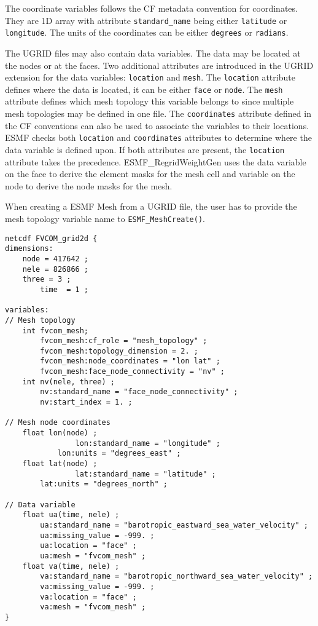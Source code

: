 The coordinate variables follows the CF metadata convention for coordinates.  They are 1D array with attribute
{\tt standard\_name} being either {\tt latitude} or {\tt longitude}.  The units of the coordinates can be either {\tt degrees} or {\tt radians}.

The UGRID files may also contain data variables.  The data may be located at the nodes or at the faces.  Two additional attributes are introduced in the UGRID extension for the data variables:  {\tt location} and {\tt mesh}.  The {\tt location}
attribute defines where the data is located, it can be either {\tt face} or {\tt node}.  The {\tt mesh} attribute defines which mesh topology this variable belongs to since multiple mesh topologies may be defined in one
file.  The {\tt coordinates} attribute defined in the CF conventions can also be used to associate the variables to their locations.  ESMF checks both {\tt location} and {\tt coordinates} attributes to determine where the data variable is defined upon. If both attributes are present, the {\tt location} attribute takes the precedence.  ESMF\_RegridWeightGen uses the data variable on the face to derive the element masks for the mesh cell and variable on the node to derive the node masks for the mesh.

When creating a ESMF Mesh from a UGRID file, the user has to provide the mesh topology variable name to {\tt ESMF\_MeshCreate()}.

\begin{verbatim}
netcdf FVCOM_grid2d {
dimensions:
	node = 417642 ;
	nele = 826866 ;
	three = 3 ;
        time  = 1 ;

variables:
// Mesh topology
	int fvcom_mesh;
		fvcom_mesh:cf_role = "mesh_topology" ;
		fvcom_mesh:topology_dimension = 2. ;
		fvcom_mesh:node_coordinates = "lon lat" ;
		fvcom_mesh:face_node_connectivity = "nv" ;
	int nv(nele, three) ;
		nv:standard_name = "face_node_connectivity" ;
		nv:start_index = 1. ;

// Mesh node coordinates
	float lon(node) ;
                lon:standard_name = "longitude" ;
	        lon:units = "degrees_east" ;
	float lat(node) ;
                lat:standard_name = "latitude" ;
		lat:units = "degrees_north" ;

// Data variable
	float ua(time, nele) ;
		ua:standard_name = "barotropic_eastward_sea_water_velocity" ;
		ua:missing_value = -999. ;
		ua:location = "face" ;
		ua:mesh = "fvcom_mesh" ;
	float va(time, nele) ;
		va:standard_name = "barotropic_northward_sea_water_velocity" ;
		va:missing_value = -999. ;
		va:location = "face" ;
		va:mesh = "fvcom_mesh" ;
}
\end{verbatim}

